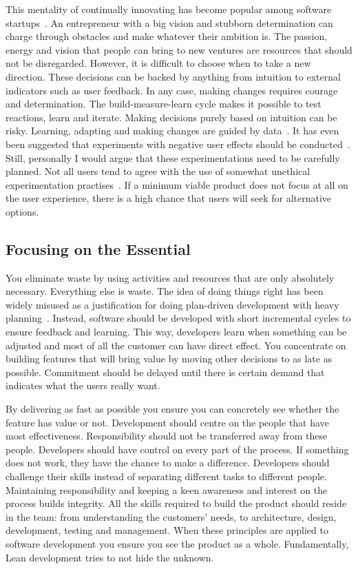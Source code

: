 \documentclass[english]{tktltiki2}
\begin{document}
This mentality of continually innovating has become popular among software startups~\cite{Rie11}. An entrepreneur with a big vision and stubborn determination can charge through obstacles and make whatever their ambition is. The passion, energy and vision that people can bring to new ventures are resources that should not be disregarded. However, it is difficult to choose when to take a new direction. These decisions can be backed by anything from intuition to external indicators such as user feedback. In any case, making changes requires courage and determination. The build-measure-learn cycle makes it possible to test reactions, learn and iterate. Making decisions purely based on intuition can be risky. Learning, adapting and making changes are guided by data~\cite{Rie11}. It has even been suggested that experiments with negative user effects should be conducted~\cite{KLS09, KDF12, Bos12}. Still, personally I would argue that these experimentations need to be carefully planned. Not all users tend to agree with the use of somewhat unethical experimentation practises~\cite{RM13}. If a minimum viable product does not focus at all on the user experience, there is a high chance that users will seek for alternative options.

\subsection{Focusing on the Essential}

You eliminate waste by using activities and resources that are only absolutely necessary. Everything else is waste. The idea of doing things right has been widely misused as a justification for doing plan-driven development with heavy planning~\cite{Pop02}. Instead, software should be developed with short incremental cycles to ensure feedback and learning. This way, developers learn when something can be adjusted and most of all the customer can have direct effect. You concentrate on building features that will bring value by moving other decisions to as late as possible. Commitment should be delayed until there is certain demand that indicates what the users really want.

By delivering as fast as possible you ensure you can concretely see whether the feature has value or not. Development should centre on the people that have most effectiveness. Responsibility should not be transferred away from these people. Developers should have control on every part of the process. If something does not work, they have the chance to make a difference. Developers should challenge their skills instead of separating different tasks to different people. Maintaining responsibility and keeping a keen awareness and interest on the process builds integrity. All the skills required to build the product should reside in the team: from understanding the customers’ needs, to architecture, design, development, testing and management. When these principles are applied to software development you ensure you see the product as a whole. Fundamentally, Lean development tries to not hide the unknown.
\end{document}
